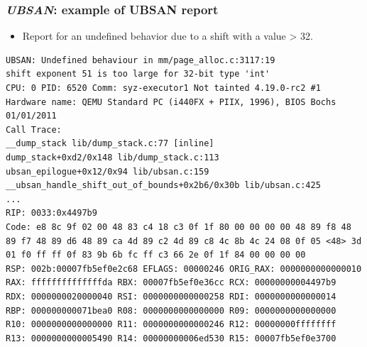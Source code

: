 \begin{frame}[fragile]
  \frametitle{{\em UBSAN}: example of UBSAN report}
  \begin{itemize}
    \item Report for an undefined behavior due to a shift with a value > 32.
  \end{itemize}
  \begin{block}{}
    \begin{verbatim}
UBSAN: Undefined behaviour in mm/page_alloc.c:3117:19
shift exponent 51 is too large for 32-bit type 'int'
CPU: 0 PID: 6520 Comm: syz-executor1 Not tainted 4.19.0-rc2 #1
Hardware name: QEMU Standard PC (i440FX + PIIX, 1996), BIOS Bochs 01/01/2011
Call Trace:
__dump_stack lib/dump_stack.c:77 [inline]
dump_stack+0xd2/0x148 lib/dump_stack.c:113
ubsan_epilogue+0x12/0x94 lib/ubsan.c:159
__ubsan_handle_shift_out_of_bounds+0x2b6/0x30b lib/ubsan.c:425
...
RIP: 0033:0x4497b9
Code: e8 8c 9f 02 00 48 83 c4 18 c3 0f 1f 80 00 00 00 00 48 89 f8 48
89 f7 48 89 d6 48 89 ca 4d 89 c2 4d 89 c8 4c 8b 4c 24 08 0f 05 <48> 3d
01 f0 ff ff 0f 83 9b 6b fc ff c3 66 2e 0f 1f 84 00 00 00 00
RSP: 002b:00007fb5ef0e2c68 EFLAGS: 00000246 ORIG_RAX: 0000000000000010
RAX: ffffffffffffffda RBX: 00007fb5ef0e36cc RCX: 00000000004497b9
RDX: 0000000020000040 RSI: 0000000000000258 RDI: 0000000000000014
RBP: 000000000071bea0 R08: 0000000000000000 R09: 0000000000000000
R10: 0000000000000000 R11: 0000000000000246 R12: 00000000ffffffff
R13: 0000000000005490 R14: 00000000006ed530 R15: 00007fb5ef0e3700 
    \end{verbatim}
  \end{block}
\end{frame}

